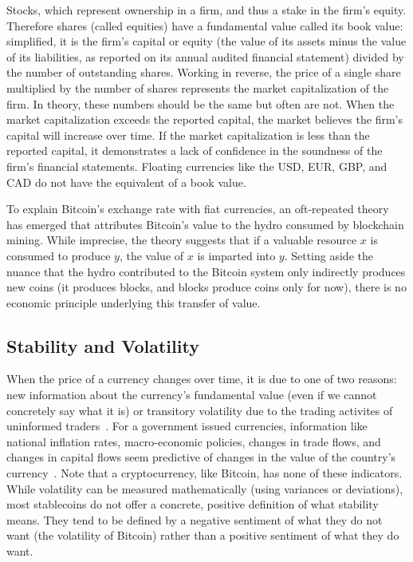 Stocks, which represent ownership in a firm, and thus a stake in the firm's equity. Therefore shares (called equities) have a fundamental value called its book value: simplified, it is the firm's capital or equity (the value of its assets minus the value of its liabilities, as reported on its annual audited financial statement) divided by the number of outstanding shares. Working in reverse, the price of a single share multiplied by the number of shares represents the market capitalization of the firm. In theory, these numbers should be the same but often are not. When the market capitalization exceeds the reported capital, the market believes the firm's capital will increase over time. If the market capitalization is less than the reported capital, it demonstrates a lack of confidence in the soundness of the firm's financial statements. Floating currencies like the USD, EUR, GBP, and CAD do not have the equivalent of a book value.

To explain Bitcoin's exchange rate with fiat currencies, an oft-repeated theory has emerged that attributes Bitcoin's value to the hydro consumed by blockchain mining. While imprecise, the theory suggests that if a valuable resource $x$ is consumed to produce $y$, the value of $x$ is imparted into $y$. Setting aside the nuance that the hydro contributed to the Bitcoin system only indirectly produces new coins (it produces blocks, and blocks produce coins only for now), there is no economic principle underlying this transfer of value.



\subsection{Stability and Volatility}

When the price of a currency changes over time, it is due to one of two reasons: new information about the currency's fundamental value (even if we cannot concretely say what it is) or transitory volatility due to the trading activites of uninformed traders~\cite{harris2003trading}. For a government issued currencies, information like national inflation rates, macro-economic policies, changes in trade flows, and changes in capital flows seem predictive of changes in the value of the country's currency~\cite{harris2003trading}. Note that a cryptocurrency, like Bitcoin, has none of these indicators. While volatility can be measured mathematically (using variances or deviations), most stablecoins do not offer a concrete, positive definition of what stability means. They tend to be defined by a negative sentiment of what they do not want (the volatility of Bitcoin) rather than a positive sentiment of what they do want.

